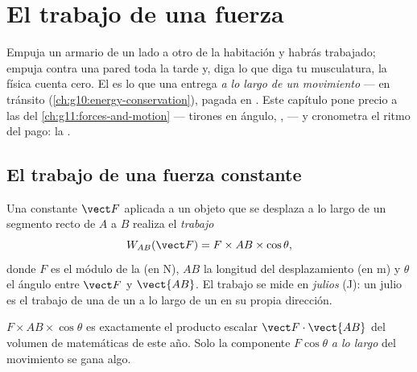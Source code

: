 \chapter{El trabajo de una fuerza}\label{ch:g11:work-of-force}

Empuja un armario de un lado a otro de la habitación y habrás
trabajado; empuja contra una pared toda la tarde y, diga lo que diga tu
musculatura, la física cuenta cero. El  es lo que una 
entrega \emph{a lo largo de un movimiento} ---  en tránsito
(\cref{ch:g10:energy-conservation}), pagada en . Este capítulo
pone precio a las  del \cref{ch:g11:forces-and-motion} ---
tirones en ángulo, ,  --- y cronometra el ritmo del pago:
la .

\section{El trabajo de una fuerza constante}

\begin{definition}\label{def:g11:work-of-force:work}
Una  constante $\vect F$ aplicada a un objeto que se desplaza a lo
largo de un segmento recto de $A$ a $B$ realiza el
\emph{trabajo}
\[
W_{AB}(\vect F) = F \times AB \times \cos\theta ,
\]
donde $F$ es el módulo de la  (en \unit{N}), $AB$ la longitud del
desplazamiento (en \unit{m}) y $\theta$ el ángulo entre $\vect F$ y
$\vect{AB}$. El trabajo se mide en \emph{julios}
(\unit{J}): un julio es el trabajo de una  de un  a lo largo
de un  en su propia dirección.
\end{definition}

\begin{remark}\label{rem:g11:work-of-force:scal}
$F \times AB \times \cos\theta$ es exactamente el producto escalar
$\vect F \cdot \vect{AB}$ del volumen de matemáticas de este año. Solo
la componente $F\cos\theta$ \emph{a lo largo} del movimiento se gana
algo.
\end{remark}

